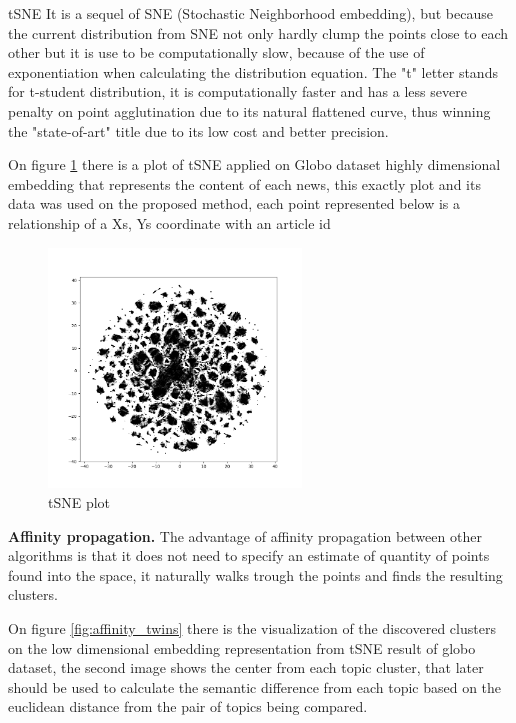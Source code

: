 \documentclass[ecp,tc,english]{iiufrgs}
\begin{document}
    tSNE It is a sequel of SNE (Stochastic Neighborhood embedding), but because the current distribution from SNE not only hardly clump the points close to each other but it is use to be computationally slow, because of the use of exponentiation when calculating the distribution equation.
    The "t" letter stands for t-student distribution, it is computationally faster and has a less severe penalty on point agglutination due to its natural flattened curve, thus winning the "state-of-art" title due to its low cost and better precision.

    On figure \ref{fig:tsne_plot} there is a plot of tSNE applied on Globo dataset highly dimensional embedding that represents the content of each news, this exactly plot and its data was used on the proposed method, each point represented below is a relationship of a Xs, Ys coordinate with an article id 

    \begin{figure}[H]
        \centering
        \includegraphics[width=0.6\textwidth]{images/tsne_clusters.png}
        \caption{tSNE plot}
        \label{fig:tsne_plot}
    \end{figure}

    \textbf{Affinity propagation.} The advantage of affinity propagation between other algorithms is that it does not need to specify an estimate of quantity of points found into the space, it naturally walks trough the points and finds the resulting clusters.

    On figure \ref{fig:affinity_twins} there is the visualization of the discovered clusters on the low dimensional embedding representation from tSNE result of globo dataset, the second image shows the center from each topic cluster, that later should be used to calculate the semantic difference from each topic based on the euclidean distance from the pair of topics being compared.
     
\end{document}
